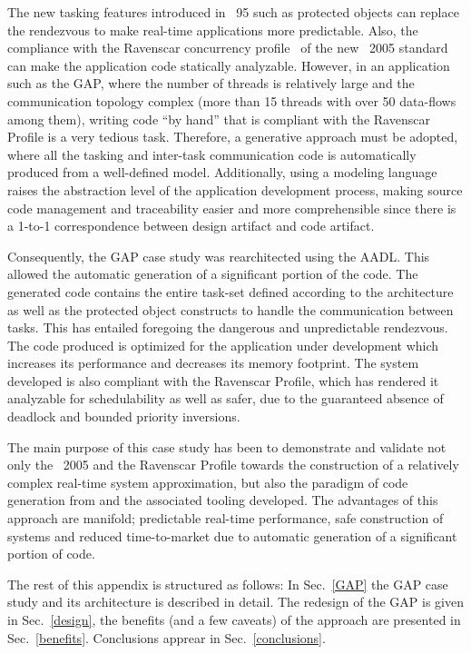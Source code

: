The new tasking features introduced in \ada~95 such as protected
objects can replace the rendezvous to make real-time applications more
predictable. Also, the compliance with the Ravenscar concurrency
profile~\cite{burns@adalett04} of the new \ada~2005 standard can make
the application code statically analyzable. However, in an application
such as the GAP, where the number of threads is relatively large and
the communication topology complex (more than 15 threads with over 50
data-flows among them), writing code ``by hand'' that is compliant
with the Ravenscar Profile is a very tedious task. Therefore, a
generative approach must be adopted, where all the tasking and
inter-task communication code is automatically produced from a
well-defined model. Additionally, using a modeling language raises the
abstraction level of the application development process, making
source code management and traceability easier and more comprehensible
since there is a 1-to-1 correspondence between design artifact and
code artifact.

Consequently, the GAP case study was rearchitected using the
AADL. This allowed the automatic generation of a significant portion
of the code. The generated code contains the entire task-set defined
according to the architecture as well as the \ada protected object
constructs to handle the communication between tasks. This has
entailed foregoing the dangerous and unpredictable rendezvous. The
code produced is optimized for the application under development which
increases its performance and decreases its memory footprint. The
system developed is also compliant with the Ravenscar Profile, which
has rendered it analyzable for schedulability as well as safer, due to
the guaranteed absence of deadlock and bounded priority inversions.

The main purpose of this case study has been to demonstrate and
validate not only the \ada~2005 and the Ravenscar Profile towards the
construction of a relatively complex real-time system approximation,
but also the paradigm of code generation from \aadl and the associated
tooling developed. The advantages of this approach are manifold;
predictable real-time performance, safe construction of systems and
reduced time-to-market due to automatic generation of a significant
portion of code.

The rest of this appendix is structured as follows: In
Sec.~\ref{GAP} the GAP case study and its architecture is described
in detail. The redesign of the GAP is given in Sec.~\ref{design},
the benefits (and a few caveats) of the approach are presented in
Sec.~\ref{benefits}. Conclusions apprear in Sec.~\ref{conclusions}.

